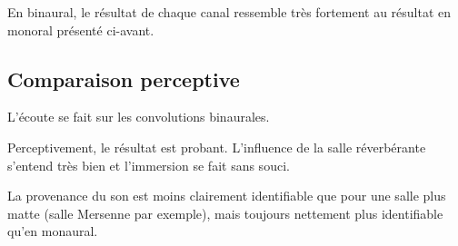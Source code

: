 En binaural, le résultat de chaque canal ressemble très fortement au résultat en monoral présenté ci-avant.

\subsection{Comparaison perceptive} %

L'écoute se fait sur les convolutions binaurales.

Perceptivement, le résultat est probant. L'influence de la salle réverbérante s'entend très bien et l'immersion se fait
sans souci.

La provenance du son est moins clairement identifiable que pour une salle plus matte (salle Mersenne par exemple),
mais toujours nettement plus identifiable qu'en monaural.
